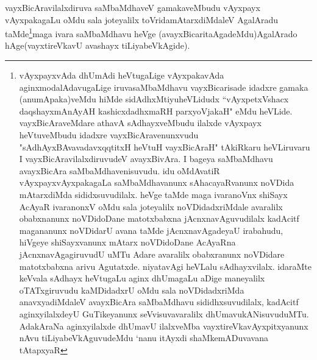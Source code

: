 \begin{artha}
vayxBicAravilalxdiruva saMbaMdhaveV gamakaveMbudu vAyxpayx vAyxpakagaLu oMdu sala joteyalilx toVridamAtarxdiMdaleV AgalAradu taMde\footnote{vAyxpayxvAda dhUmAdi heVtugaLige vAyxpakavAda aginxmodalAdavugaLige iruvasaMbaMdhavu vayxBicarisade idadxre gamaka (anumApaka)veMdu hiMde sidAdhxMtiyuheVLidudx ``vAyxpetxVshacx daqshayxmAnAyAH kashicxdadhxmaRH parxyoVjakaH" eMdu heVLide. vayxBicAraveMdare athavA sAdhayxveMbudu ilalxde vAyxpayx heVtuveMbudu idadxre vayxBicAravenunxvudu "sAdhAyxBAvavadavxqqtitxH heVtuH vayxBicAraH" tAkiRkaru heVLiruvaru I vayxBicAravilalxdiruvudeV avayxBivAra. I bageya saMbaMdhavu avayxBicAra saMbaMdhavenisuvudu. idu oMdAvatiR vAyxpayxvAyxpakagaLa saMbaMdhavanunx sAhacayaRvanunx noVDida mAtarxdiMda sididxsuvudilalx. heVge taMde maga ivaranoVnx shiSayx AcAyaR ivaranonxV oMdu sala joteyalilx noVDidadxriMdale avaralilx obabxnanunx noVDidoDane matotxbabxna jAcnxnavAguvudilalx kadAcitf magananunx noVDidarU avana taMde jAcnxnavAgadeyaU irabahudu, hiVgeye shiSayxvanunx mAtarx noVDidoDane AcAyaRna jAcnxnavAgagiruvudU uMTu  Adare avaralilx obabxranunx noVDidare matotxbabxna arivu Agutatxde. niyatavAgi heVLalu sAdhayxvilalx. idaraMte keVvala sAdhayx heVtugaLu aginx dhUmagaLu aDige maneyalilx oTATxgiruvudu kaMDidadxrU oMdu sala noVDidadxriMda anavxyadiMdaleV avayxBicAra saMbaMdhavu sididhxsuvudilalx, kadAcitf aginxyilalxdeyU GuTikeyanunx seVvisuvavaralilx dhUmavukANisuvuduMTu. AdakAraNa aginxyilalxde dhUmavU ilalxveMba vayxtireVkavAyxpitxyanunx nAvu tiLiyabeVkAguvudeMdu `nanu itAyxdi shaMkemADuvavana tAtapxyaR}maga ivara saMbaMdhavu heVge (avayxBicaritaAgadeMdu)AgalArado hAge(vayxtireVkavU avashayx tiLiyabeVkAgide).
\end{artha}


